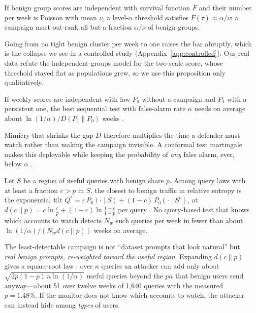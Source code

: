 \begin{proposition}\label{prop:max}
If benign group scores are independent with survival function $\bar F$ and their number per week is Poisson with mean $\nu$, a level-$\alpha$ threshold satisfies $\bar F(\tau)\approx\alpha/\nu$: a campaign must out-rank all but a fraction $\alpha/\nu$ of benign groups.
\end{proposition}

Going from no tight benign cluster per week to one raises the bar abruptly, which is the collapse we see in a controlled study (Appendix~\ref{app:controlled}). Our real data refute the independent-groups model for the two-scale score, whose threshold stayed flat as populations grew, so we use this proposition only qualitatively.

\begin{proposition}\label{prop:seq}
If weekly scores are independent with law $P_0$ without a campaign and $P_1$ with a persistent one, the best sequential test with false-alarm rate $\alpha$ needs on average about $\ln(1/\alpha)/D(P_1\|P_0)$ weeks \citep{wald1945sequential,wald1948optimum}.
\end{proposition}

Mimicry that shrinks the gap $D$ therefore multiplies the time a defender must watch rather than making the campaign invisible. A conformal test martingale makes this deployable while keeping the probability of \emph{any} false alarm, ever, below $\alpha$ \citep{vovk2021testing,vovk2021retrain,ramdas2023gametheoretic}.

\begin{proposition}\label{prop:lfc}
Let $S$ be a region of useful queries with benign share $p$. Among query laws with at least a fraction $c>p$ in $S$, the closest to benign traffic in relative entropy is the exponential tilt $Q^*=c\,P_0(\cdot\mid S)+(1-c)\,P_0(\cdot\mid S^c)$, at $d(c\|p)=c\ln\frac{c}{p}+(1-c)\ln\frac{1-c}{1-p}$ per query \citep{csiszar1975idivergence}. No query-based test that knows which accounts to watch detects $N_w$ such queries per week in fewer than about $\ln(1/\alpha)/(N_w d(c\|p))$ weeks on average.
\end{proposition}

The least-detectable campaign is not ``dataset prompts that look natural'' but \emph{real benign prompts, re-weighted toward the useful region}. Expanding $d(c\|p)$ gives a square-root law \citep{ker2007capacity,bash2013limits}: over $n$ queries an attacker can add only about $\sqrt{2p(1-p)\,n\ln(1/\alpha)}$ useful queries beyond the $pn$ that benign users send anyway---about 51 over twelve weeks of 1{,}640 queries with the measured $p=1.48\%$. If the monitor does not know which accounts to watch, the attacker can instead hide among \emph{types} of users.

